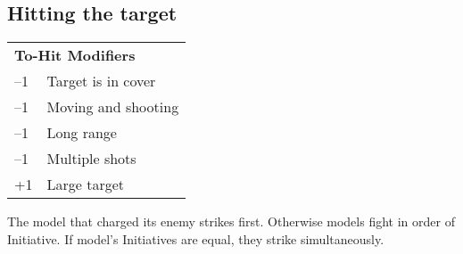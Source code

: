 
\subsection*{Hitting the target}
\begin{nscenter}
\end{nscenter}
\begin{center}
\begin{tabular}{ll}
\multicolumn{2}{l}{\textbf{To-Hit Modifiers}} \\
–1            & Target is in cover            \\
–1            & Moving and shooting           \\
–1            & Long range                    \\
–1            & Multiple shots                \\
+1            & Large target                 
\end{tabular}
\end{center}

The model that charged its enemy strikes first.
Otherwise models fight in order of Initiative. If model's Initiatives are equal, they strike simultaneously.

